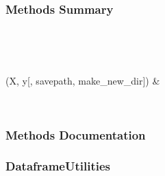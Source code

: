 \documentclass[letterpaper,10pt,english]{sphinxmanual}
\begin{document}
\begin{fulllineitems}
\begin{description}
\begin{description}
\end{description}

\end{description}
\subsubsection*{Methods Summary}


\begin{savenotes}\sphinxatlongtablestart\begin{longtable}[c]{}
\hline

\endfirsthead

%
{}\\
\hline

\endhead

\hline
{}\\
\endfoot

\endlastfoot

{\hyperref[\detokenize{api/mastml.feature_generators.BaseGenerator:mastml.feature_generators.BaseGenerator.evaluate}]{}}(X, y{[}, savepath, make\_new\_dir{]})
&

\\
\hline
\end{longtable}\sphinxatlongtableend\end{savenotes}
\subsubsection*{Methods Documentation}

\begin{fulllineitems}
\label{\detokenize{api/mastml.feature_generators.BaseGenerator:mastml.feature_generators.BaseGenerator.evaluate}}
\end{fulllineitems}


\end{fulllineitems}



\subsubsection{DataframeUtilities}
\label{\detokenize{api/mastml.feature_generators.DataframeUtilities:dataframeutilities}}\label{\detokenize{api/mastml.feature_generators.DataframeUtilities::doc}}
\end{document}
